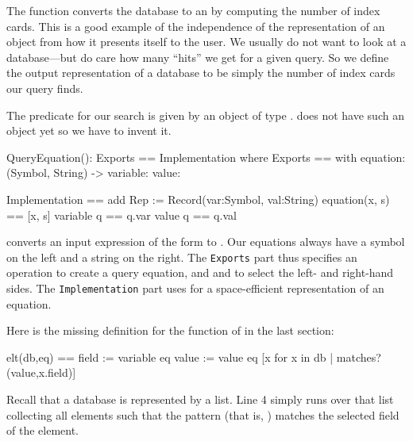 {{{{{{{The  function converts the database to an
 by computing the number of index cards.
This is a good example of the independence of
the representation of an \Language{} object from how it presents
itself to the user. We usually do not want to look at a database---but
do care how many ``hits'' we get for a given query.
So we define the output representation of a database to be simply
the number of index cards our query finds.

The predicate for our search is given by an object of type
.
\Language{} does not have such an object yet so we
have to invent it.

\begin{xmpLines}
QueryEquation(): Exports == Implementation where
  Exports == with
    equation: (Symbol, String) -> %
    variable: %
    value:    %

  Implementation == add
    Rep := Record(var:Symbol, val:String)
    equation(x, s) == [x, s]
    variable q == q.var
    value    q == q.val
\end{xmpLines}

\Language{} converts an input expression of the form
 to .
Our equations always have a symbol on the left and a string
on the right.
The {\tt Exports} part thus specifies an operation
 to create a query equation, and
 and  to select the left- and
right-hand sides.
The {\tt Implementation} part uses  for a
space-efficient representation of an equation.

Here is the missing definition for the  function of
 in the last section:

\begin{xmpLines}
    elt(db,eq) ==
      field  := variable eq
      value := value eq
      [x for x in db | matches?(value,x.field)]
\end{xmpLines}

Recall that a database is represented by a list.
Line 4 simply runs over that list collecting all elements
such that the pattern (that is, )
matches the selected field of the element.


}}}}}}}
